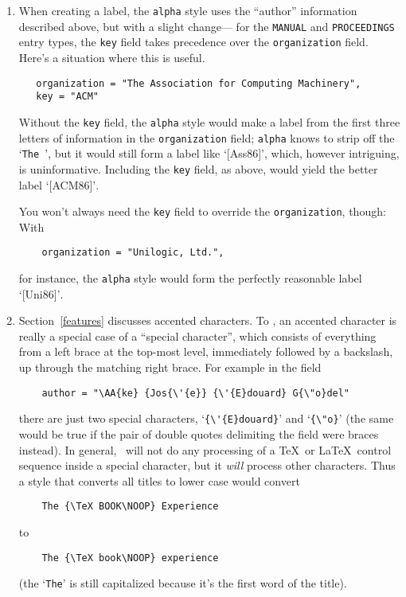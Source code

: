 \begin{enumerate}
\item
When creating a label,
the \hbox{\tt alpha} style uses the ``author'' information described above,
but with a slight change---%
for the \hbox{\tt MANUAL} and \hbox{\tt PROCEEDINGS} entry types,
the {\tt key} field takes precedence over the \hbox{\tt organization} field.
Here's a situation where this is useful.
\begin{verbatim}
   organization = "The Association for Computing Machinery",
   key = "ACM"
\end{verbatim}
Without the {\tt key} field, the \hbox{\tt alpha} style
would make a label from the first three letters of information
in the \hbox{\tt organization} field;
\hbox{\tt alpha} knows to strip off the `\hbox{\tt The }'$\!$,
but it would still form a label like `\hbox{[Ass86]}'$\!$,
which, however intriguing, is uninformative.
Including the {\tt key} field, as above,
would yield the better label `\hbox{[ACM86]}'$\!$.

You won't always need the {\tt key} field to override the
\hbox{\tt organization}, though:
With
\begin{verbatim}
    organization = "Unilogic, Ltd.",
\end{verbatim}
for instance, the \hbox{\tt alpha} style would
form the perfectly reasonable label `\hbox{[Uni86]}'$\!$.

\item
Section~\ref{features} discusses accented characters.
To \BibTeX, an accented character is really a special case
of a ``special character''$\!$,
which consists of everything from a left brace at the top-most level,
immediately followed by a backslash,
up through the matching right brace.
For example in the field
\begin{verbatim}
    author = "\AA{ke} {Jos{\'{e}} {\'{E}douard} G{\"o}del"
\end{verbatim}
there are just two special characters,
`\hbox{\verb|{\'{E}douard}|}' and `\hbox{\verb|{\"o}|}'
(the same would be true if the pair of double quotes
delimiting the field were braces instead).
In general, \BibTeX\ will not do any processing
of a \TeX\ or \LaTeX\ control sequence inside a special character,
but it {\em will\/} process other characters.
Thus a style that converts all titles to lower case
would convert
\begin{verbatim}
    The {\TeX BOOK\NOOP} Experience
\end{verbatim}
to
\begin{verbatim}
    The {\TeX book\NOOP} experience
\end{verbatim}
(the `{\tt The}' is still capitalized
because it's the first word of the title).


\end{enumerate}
